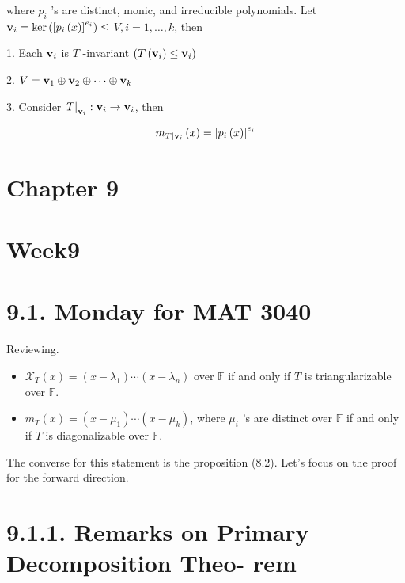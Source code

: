 \documentclass[11pt]{article}
\begin{document}
where \({p}_{i}\) ’s are distinct, monic, and irreducible polynomials. Let \({\bf v}_{i} = \ker \left( {\left\lbrack  {p}_{i}\left( x\right) \right\rbrack  }^{{e}_{i}}\right)  \leq\)  \(V,i = 1,\ldots ,k\), then

1. Each \({\bf v}_{i}\) is \(T\) -invariant \(\left( {T\left( {\bf v}_{i}\right)  \leq  {\bf v}_{i}}\right)\)

2. \(V = {\bf v}_1 \oplus  {\bf v}_2 \oplus  \cdots  \oplus  {\bf v}_{k}\)

3. Consider \({\left. T\right| }_{{\bf v}_{i}} : {\bf v}_{i} \rightarrow  {\bf v}_{i}\), then

\[
{m}_{T \mid  {\bf v}_{i}}\left( x\right)  = {\left\lbrack  {p}_{i}\left( x\right) \right\rbrack  }^{{e}_{i}}
\]

\section*{Chapter 9}

\section*{Week9}

\section*{9.1. Monday for MAT 3040}

Reviewing.

\begin{itemize}
\item \({\mathcal{X}}_{T}\left( x\right)  = \left( {x - {\lambda }_1}\right) \cdots \left( {x - {\lambda }_n}\right)\) over \(\mathbb{F}\) if and only if \(T\) is triangularizable over \(\mathbb{F}\).
\end{itemize}

\begin{itemize}
\item \({m}_{T}\left( x\right)  = \left( {x - {\mu }_1}\right) \cdots \left( {x - {\mu }_{k}}\right)\), where \({\mu }_{i}\) ’s are distinct over \(\mathbb{F}\) if and only if \(T\) is diagonalizable over \(\mathbb{F}\).
\end{itemize}

The converse for this statement is the proposition (8.2). Let's focus on the proof for the forward direction.

\section*{9.1.1. Remarks on Primary Decomposition Theo- rem}
\end{document}

